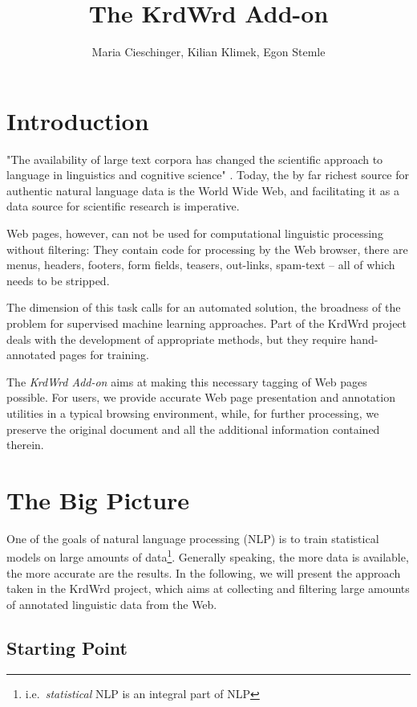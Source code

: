\documentclass[12pt,a4paper]{article}
\title{The KrdWrd Add-on}
\author{Maria Cieschinger, Kilian Klimek, Egon Stemle}
\begin{document}
\maketitle


\section{Introduction}

"The availability of large text corpora has changed the scientific approach to language in linguistics and cognitive science" \cite{ManningSchuetze1999}.
Today, the by far richest source for authentic natural language data is the World Wide Web, and facilitating it as a data source for scientific research is imperative.

Web pages, however, can not be used for computational linguistic processing without filtering:
They contain code for processing by the Web browser, there are menus, headers, footers, form fields, teasers, out-links, spam-text -- all of which needs to be stripped.

The dimension of this task calls for an automated solution, the broadness of the problem for supervised machine learning approaches.
Part of the KrdWrd \cite{krdwrd.org} project deals with the development of appropriate methods, but they require hand-annotated pages for training.

The \textit{KrdWrd Add-on} aims at making this necessary tagging of Web pages possible.
For users, we provide accurate Web page presentation and annotation utilities in a typical browsing environment, while, for further processing, we preserve the original document and all the additional information contained therein.


\section{The Big Picture}

One of the goals of natural language processing (NLP) is to train statistical models on large amounts of data\footnote{i.e.~\textit{statistical} NLP is an integral part of NLP}. Generally speaking, the more data is available, the more accurate are the results. In the following, we will present the approach taken in the KrdWrd project, which aims at collecting and filtering large amounts of annotated linguistic data from the Web.


\subsection{Starting Point}
\end{document}
